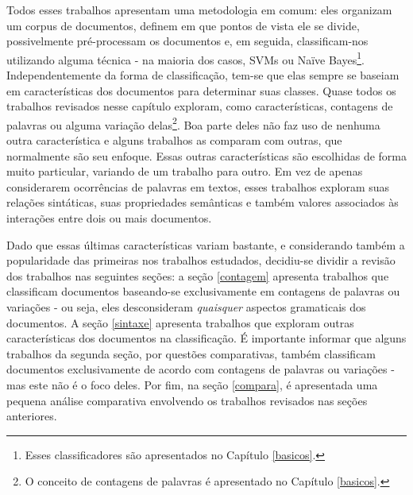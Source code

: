 Todos esses trabalhos apresentam uma metodologia em comum: eles organizam um corpus de documentos, definem em que pontos de vista ele se divide, possivelmente pré-processam os documentos e, em seguida, classificam-nos utilizando alguma técnica - na maioria dos casos, SVMs ou Naïve Bayes\footnote{Esses classificadores são apresentados no Capítulo \ref{basicos}.}. Independentemente da forma de classificação, tem-se que elas sempre se baseiam em características dos documentos para determinar suas classes. Quase todos os trabalhos revisados nesse capítulo exploram, como características,  contagens de palavras ou alguma variação delas\footnote{O conceito de contagens de palavras é apresentado no Capítulo \ref{basicos}.}. Boa parte deles não faz uso de nenhuma outra característica e alguns trabalhos as comparam com outras, que normalmente são seu enfoque. Essas outras características são escolhidas de forma muito particular, variando de um trabalho para outro. Em vez de apenas considerarem ocorrências de palavras em textos, esses trabalhos exploram suas relações sintáticas, suas propriedades semânticas e também valores associados às interações entre dois ou mais documentos. 

Dado que essas últimas características variam bastante, e considerando também a popularidade das primeiras nos trabalhos estudados, decidiu-se dividir a revisão dos trabalhos nas seguintes seções: a seção \ref{contagem} apresenta trabalhos que classificam documentos baseando-se exclusivamente em contagens de palavras ou variações - ou seja, eles desconsideram \emph{quaisquer} aspectos gramaticais dos documentos. A seção \ref{sintaxe} apresenta trabalhos que exploram outras características dos documentos na classificação. É importante informar que alguns trabalhos da segunda seção, por questões comparativas, também classificam documentos exclusivamente de acordo com contagens de palavras ou variações - mas este não é o foco deles.  Por fim, na seção \ref{compara}, é apresentada uma pequena análise comparativa envolvendo os trabalhos revisados nas seções anteriores.


